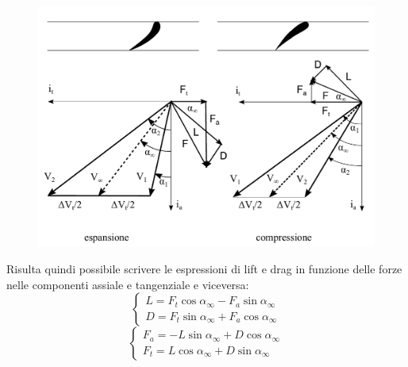\begin{figure}
\centering
  \includegraphics[width=.7\textwidth]{fig/triang1.pdf}
\caption{}
\label{fig:triang1}
\end{figure}
Risulta quindi possibile scrivere le espressioni di lift e drag in funzione delle forze nelle componenti assiale e tangenziale e viceversa:
\begin{equation}\label{eq:c_L}
	\begin{cases} 
		L = F_t \cos \alpha_{\infty} -  F_a \sin \alpha_{\infty}\\
		D = F_t \sin \alpha_{\infty} +  F_a \cos \alpha_{\infty}
	\end{cases}
\end{equation}
\begin{equation}
	\begin{cases} 
		F_a = - L\sin \alpha_{\infty} +  D \cos \alpha_{\infty}\\
		F_t = L \cos \alpha_{\infty} +  D \sin \alpha_{\infty}
	\end{cases}
\end{equation}
